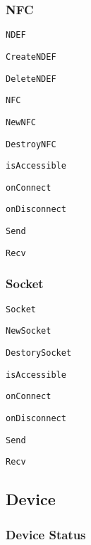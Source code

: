 \subsubsection*{N\-F\-C}


\begin{DoxyItemize}
\item {\tt N\-D\-E\-F}
\begin{DoxyItemize}
\item {\tt Create\-N\-D\-E\-F}
\item {\tt Delete\-N\-D\-E\-F}
\end{DoxyItemize}
\item {\tt N\-F\-C}
\begin{DoxyItemize}
\item {\tt New\-N\-F\-C}
\item {\tt Destroy\-N\-F\-C}
\item {\tt is\-Accessible}
\item {\tt on\-Connect}
\item {\tt on\-Disconnect}
\item {\tt Send}
\item {\tt Recv}
\end{DoxyItemize}
\end{DoxyItemize}

\subsubsection*{Socket}


\begin{DoxyItemize}
\item {\tt Socket}
\begin{DoxyItemize}
\item {\tt New\-Socket}
\item {\tt Destory\-Socket}
\item {\tt is\-Accessible}
\item {\tt on\-Connect}
\item {\tt on\-Disconnect}
\item {\tt Send}
\item {\tt Recv}
\end{DoxyItemize}
\end{DoxyItemize}

\subsection*{Device}

\subsubsection*{Device Status}



